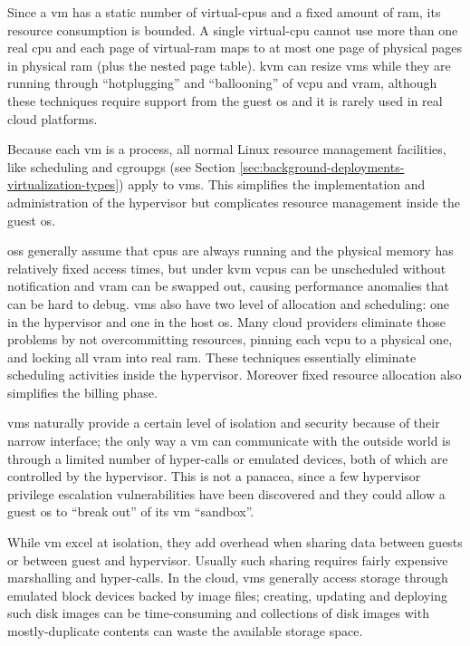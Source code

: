 Since a \ac{vm} has a static number of virtual-\acs{cpu}s and a fixed amount of \acs{ram}, its resource
consumption is bounded. A single virtual-\acs{cpu} cannot use more than one real \acs{cpu} and each page
of virtual-\acs{ram} maps to at most one page of physical pages in physical \acs{ram} (plus the nested page
table). \ac{kvm} can resize \ac{vm}s while they are running through ``hotplugging'' and ``ballooning''
of v\acs{cpu} and v\acs{ram}, although these techniques require support from the guest \acs{os} and it
is rarely used in real cloud platforms.

Because each \ac{vm} is a process, all normal Linux resource management facilities, like scheduling and
cgroupgs (see Section \ref{sec:background-deployments-virtualization-types}) apply to \ac{vm}s. This
simplifies the implementation and administration of the hypervisor but complicates resource management
inside the guest \acs{os}.

\acs{os}s generally assume that \acs{cpu}s are always running and the physical memory has relatively
fixed access times, but under \ac{kvm} v\acs{cpu}s can be unscheduled without notification and v\acs{ram} can
be swapped out, causing performance anomalies that can be hard to debug. \ac{vm}s also have two level
of allocation and scheduling: one in the hypervisor and one in the host \acs{os}. Many cloud providers
eliminate those problems by not overcommitting resources, pinning each v\acs{cpu} to a physical one,
and locking all v\acs{ram} into real \acs{ram}. These techniques essentially eliminate scheduling
activities inside the hypervisor. Moreover fixed resource allocation also simplifies the billing
phase.

\ac{vm}s naturally provide a certain level of isolation and security because of their narrow interface;
the only way a \ac{vm} can communicate with the outside world is through a limited number of hyper-calls
or emulated devices, both of which are controlled by the hypervisor. This is not a panacea, since a few
hypervisor privilege escalation vulnerabilities have been discovered and they could allow a guest \acs{os}
to ``break out'' of its \ac{vm} ``sandbox''.

While \ac{vm} excel at isolation, they add overhead when sharing data between guests or between guest
and hypervisor. Usually such sharing requires fairly expensive marshalling and hyper-calls. In the
cloud, \ac{vm}s generally access storage through emulated block devices backed by image files; creating,
updating and deploying such disk images can be time-consuming and collections of disk images with
mostly-duplicate contents can waste the available storage space.

